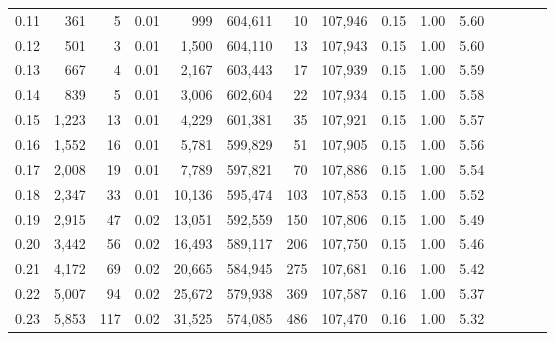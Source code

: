 \begin{tabular}{rrrcrrrrrrrrrrr}
0.11 &     361 &      5 &                                       0.01 &      999 &  604,611 &       10 &  107,946 &  0.15 &  1.00 &                         5.60 \\
0.12 &     501 &      3 &                                       0.01 &    1,500 &  604,110 &       13 &  107,943 &  0.15 &  1.00 &                         5.60 \\
0.13 &     667 &      4 &                                       0.01 &    2,167 &  603,443 &       17 &  107,939 &  0.15 &  1.00 &                         5.59 \\
0.14 &     839 &      5 &                                       0.01 &    3,006 &  602,604 &       22 &  107,934 &  0.15 &  1.00 &                         5.58 \\
0.15 &   1,223 &     13 &                                       0.01 &    4,229 &  601,381 &       35 &  107,921 &  0.15 &  1.00 &                         5.57 \\
0.16 &   1,552 &     16 &                                       0.01 &    5,781 &  599,829 &       51 &  107,905 &  0.15 &  1.00 &                         5.56 \\
0.17 &   2,008 &     19 &                                       0.01 &    7,789 &  597,821 &       70 &  107,886 &  0.15 &  1.00 &                         5.54 \\
0.18 &   2,347 &     33 &                                       0.01 &   10,136 &  595,474 &      103 &  107,853 &  0.15 &  1.00 &                         5.52 \\
0.19 &   2,915 &     47 &                                       0.02 &   13,051 &  592,559 &      150 &  107,806 &  0.15 &  1.00 &                         5.49 \\
0.20 &   3,442 &     56 &                                       0.02 &   16,493 &  589,117 &      206 &  107,750 &  0.15 &  1.00 &                         5.46 \\
0.21 &   4,172 &     69 &                                       0.02 &   20,665 &  584,945 &      275 &  107,681 &  0.16 &  1.00 &                         5.42 \\
0.22 &   5,007 &     94 &                                       0.02 &   25,672 &  579,938 &      369 &  107,587 &  0.16 &  1.00 &                         5.37 \\
0.23 &   5,853 &    117 &                                       0.02 &   31,525 &  574,085 &      486 &  107,470 &  0.16 &  1.00 &                         5.32 \\

\end{tabular}
